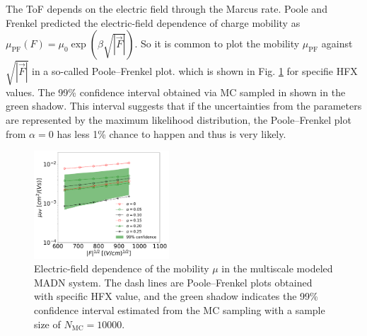 \documentclass[%
 reprint,
superscriptaddress,
 amsmath,amssymb,
 aps,
prb,
floatfix
]{revtex4-2}
\begin{document}
The ToF depends on the electric field through the Marcus rate. 
Poole and Frenkel \cite{frenkel_prebreakdown_1938} predicted the electric-field dependence of charge mobility as $\mu_\text{PF}(F)=\mu_0 \exp (\beta \sqrt{|\vec{F}|})$.
So it is common to plot the mobility $\mu_\text{PF}$ against $\sqrt{|\vec{F}|}$ in a so-called Poole–Frenkel plot.
which is shown in Fig. \ref{fig:PF_plot_ave} for specifie HFX values. The 99\% confidence interval obtained via MC sampled in shown in the green shadow. 
This interval suggests that if the uncertainties from the parameters are represented by the maximum likelihood distribution, the Poole–Frenkel plot from $\alpha=0$ has less 1\% chance to happen and thus is very likely. 
%
\begin{figure}[tbp]
    \centering
    \includegraphics[width=0.45\textwidth]{figs/fig_PF_plot_ave.pdf}
    \caption{Electric-field dependence of the mobility $\mu$ in the multiscale modeled MADN system. The dash lines are Poole–Frenkel plots obtained with specific HFX value, and the green shadow indicates the 99\% confidence interval estimated from the MC sampling with a sample size of $N_\text{MC}=10000$.}
    \label{fig:PF_plot_ave}
\end{figure}
\end{document}
